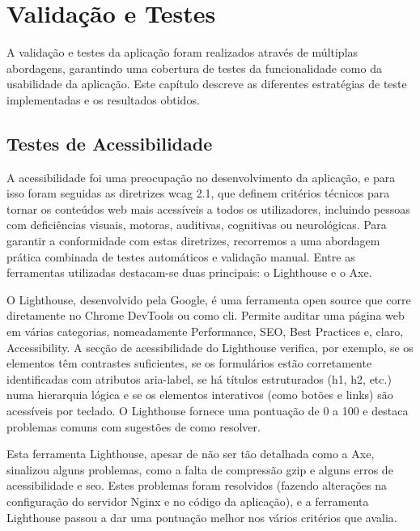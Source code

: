 \chapter{Validação e Testes}
\label{ch:validacaoTestes}

A validação e testes da aplicação foram realizados através de múltiplas abordagens, garantindo uma cobertura de testes  da funcionalidade como da usabilidade da aplicação. Este capítulo descreve as diferentes estratégias de teste implementadas e os resultados obtidos.

\section{Testes de Acessibilidade}

A acessibilidade foi uma preocupação no desenvolvimento da aplicação, e para isso foram seguidas as diretrizes \gls{wcag} 2.1, que definem critérios técnicos para tornar os conteúdos web mais acessíveis a todos os utilizadores, incluindo pessoas com deficiências visuais, motoras, auditivas, cognitivas ou neurológicas. Para garantir a conformidade com estas diretrizes, recorremos a uma abordagem prática combinada de testes automáticos e validação manual. Entre as ferramentas utilizadas destacam-se duas principais: o Lighthouse e o Axe.

O Lighthouse, desenvolvido pela Google, é uma ferramenta open source que corre diretamente no Chrome DevTools ou como \gls{cli}. Permite auditar uma página web em várias categorias, nomeadamente Performance, SEO, Best Practices e, claro, Accessibility. A secção de acessibilidade do Lighthouse verifica, por exemplo, se os elementos têm contrastes suficientes, se os formulários estão corretamente identificadas com atributos aria-label, se há títulos estruturados (h1, h2, etc.) numa hierarquia lógica e se os elementos interativos (como botões e links) são acessíveis por teclado. O Lighthouse fornece uma pontuação de 0 a 100 e destaca problemas comuns com sugestões de como resolver.

Esta ferramenta Lighthouse, apesar de não ser tão detalhada como a Axe, sinalizou alguns problemas, como a falta de compressão \gls{gzip} e alguns erros de acessibilidade e \gls{seo}. Estes problemas foram resolvidos (fazendo alterações na configuração do servidor Nginx e no código da aplicação), e a ferramenta Lighthouse passou a dar uma pontuação melhor nos vários critérios que avalia.

